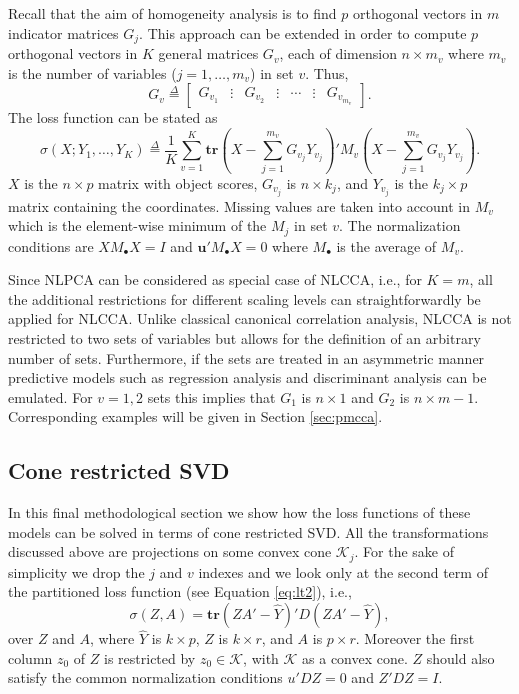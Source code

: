 \documentclass[article]{jss1}
\newcommand{\defi}{\mathop{=}\limits^{\Delta}}
\begin{document}
Recall that the aim of homogeneity analysis is to find $p$ orthogonal vectors in $m$ indicator matrices $G_j$. 
This approach can be extended in order to compute $p$ orthogonal vectors in $K$ general matrices $G_v$, each of dimension $n \times m_v$ where $m_v$ is the number of variables ($j = 1,\ldots ,m_v$) in set $v$. Thus, 
\begin{equation}
G_v\defi\begin{bmatrix}G_{v_1}&\vdots&G_{v_2}&\vdots&\cdots&\vdots&G_{v_{m_v}}\end{bmatrix}.
\end{equation}
The loss function can be stated as
\begin{equation}
\label{eq:lcca}
\sigma(X;Y_1,\ldots,Y_K)\defi\frac{1}{K}\sum_{v=1}^K\mathbf{tr}\left(X-\sum_{j=1}^{m_v}G_{v_j}Y_{v_j}\right)'M_v\left(X-\sum_{j=1}^{m_v}G_{v_j}Y_{v_j}\right).
\end{equation}
$X$ is the $n \times p$ matrix with object scores, $G_{v_j}$ is $n \times k_j$, and $Y_{v_j}$ is the $k_j \times p$ matrix containing the coordinates. Missing values are taken into account in $M_v$ which is the element-wise minimum of the $M_j$ in set $v$. The normalization conditions are $XM_\bullet X = I$ and $\mathbf{u}'M_\bullet X=0$ where $M_\bullet$ is the average of $M_v$.

Since NLPCA can be considered as special case of NLCCA, i.e., for $K=m$, all the additional restrictions for different scaling levels can straightforwardly be applied for NLCCA. 
Unlike classical canonical correlation analysis, NLCCA is not restricted to two sets of variables but allows for the definition of an arbitrary number of sets. Furthermore, if the sets are treated in an asymmetric manner predictive models such as regression analysis and discriminant analysis can be emulated. For $v=1,2$ sets this implies that $G_1$ is $n \times 1$ and $G_2$ is $n \times m-1$. Corresponding examples will be given in Section \ref{sec:pmcca}.

\subsection{Cone restricted SVD}
In this final methodological section we show how the loss functions of these models can be solved in terms of cone restricted SVD. All the transformations discussed above are projections on some convex cone $\mathcal{K}_j$.  
For the sake of simplicity we drop the $j$ and $v$ indexes and we look only at the second term of the partitioned loss function (see Equation \ref{eq:lt2}), i.e., 
\begin{equation}
\sigma(Z,A)=\mathbf{tr}(ZA'-\hat Y)'D(ZA'- \hat Y),
\end{equation}
over $Z$ and $A$, where $\hat Y$ is $k\times p$, $Z$ is $k\times r$, and $A$ is $p\times r$. Moreover
the first column $z_0$ of $Z$ is restricted by $z_0\in\mathcal{K}$, with $\mathcal{K}$
as a convex cone. $Z$ should also satisfy the common normalization conditions $u'DZ=0$ and $Z'DZ=I$.
\end{document}
